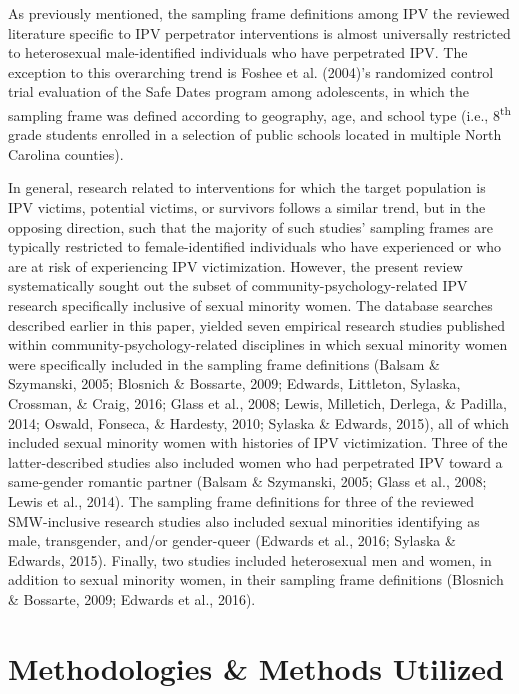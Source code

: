 \documentclass[11pt,]{tufte-book}
\begin{document}
As previously mentioned, the sampling frame definitions among IPV the
reviewed literature specific to IPV perpetrator interventions is almost
universally restricted to heterosexual male-identified individuals who
have perpetrated IPV. The exception to this overarching trend is Foshee
et al. (2004)'s randomized control trial evaluation of the Safe Dates
program among adolescents, in which the sampling frame was defined
according to geography, age, and school type (i.e.,
8\textsuperscript{th} grade students enrolled in a selection of public
schools located in multiple North Carolina counties).

In general, research related to interventions for which the target
population is IPV victims, potential victims, or survivors follows a
similar trend, but in the opposing direction, such that the majority of
such studies' sampling frames are typically restricted to
female-identified individuals who have experienced or who are at risk of
experiencing IPV victimization. However, the present review
systematically sought out the subset of community-psychology-related IPV
research specifically inclusive of sexual minority women. The database
searches described earlier in this paper, yielded seven empirical
research studies published within community-psychology-related
disciplines in which sexual minority women were specifically included in
the sampling frame definitions (Balsam \& Szymanski, 2005; Blosnich \&
Bossarte, 2009; Edwards, Littleton, Sylaska, Crossman, \& Craig, 2016;
Glass et al., 2008; Lewis, Milletich, Derlega, \& Padilla, 2014; Oswald,
Fonseca, \& Hardesty, 2010; Sylaska \& Edwards, 2015), all of which
included sexual minority women with histories of IPV victimization.
Three of the latter-described studies also included women who had
perpetrated IPV toward a same-gender romantic partner (Balsam \&
Szymanski, 2005; Glass et al., 2008; Lewis et al., 2014). The sampling
frame definitions for three of the reviewed SMW-inclusive research
studies also included sexual minorities identifying as male,
transgender, and/or gender-queer (Edwards et al., 2016; Sylaska \&
Edwards, 2015). Finally, two studies included heterosexual men and
women, in addition to sexual minority women, in their sampling frame
definitions (Blosnich \& Bossarte, 2009; Edwards et al., 2016).

\section{Methodologies \& Methods
Utilized}\label{methodologies-methods-utilized}
\end{document}
